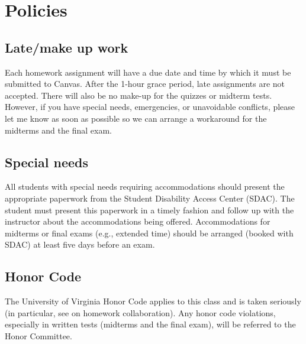 \documentclass[oneside,11pt]{amsart}
\begin{document}
\section{Policies}

\subsection{Late/make up work} 

Each homework assignment will have a due date and time by which it must be submitted to Canvas.  After the 1-hour grace period, late assignments are not accepted.  There will also be no make-up for the quizzes or midterm tests.  However, if you have special needs, emergencies, or unavoidable conflicts, please let me know as soon as possible so we can arrange a workaround for the midterms and the final exam.

\subsection{Special needs}

All students with special needs requiring accommodations should present the appropriate paperwork from the Student Disability Access Center (SDAC). The student must present this paperwork in a timely fashion and follow up with the instructor about the accommodations being offered.  Accommodations for midterms or final exams (e.g., extended time) should be arranged (booked with SDAC) at least five days before an exam.

\subsection{Honor Code} 

The University of Virginia Honor Code applies to this class and is taken seriously (in particular, see  on homework collaboration).  Any honor code violations, especially in written tests (midterms and the final exam), will be referred to the Honor Committee.
\end{document}
